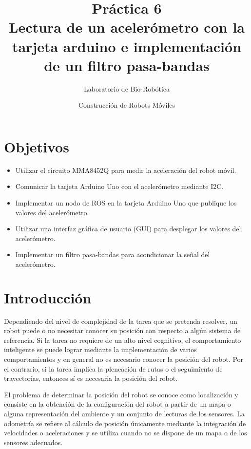 \documentclass[letterpaper,12pt]{article}
\title{Práctica 6 \\ Lectura de un acelerómetro con la tarjeta arduino e implementación de un filtro pasa-bandas}
\author{Laboratorio de Bio-Robótica}
\date{Construcción de Robots Móviles}
\begin{document}
\renewcommand{\tablename}{Tabla}
\maketitle
\section*{Objetivos}
\begin{itemize}
\item Utilizar el circuito MMA8452Q para medir la aceleración del robot móvil. 
\item Comunicar la tarjeta Arduino Uno con el acelerómetro mediante I2C.
\item Implementar un nodo de ROS en la tarjeta Arduino Uno que publique los valores del acelerómetro. 
\item Utilizar una interfaz gráfica de usuario (GUI) para desplegar los valores del acelerómetro. 
\item Implementar un filtro pasa-bandas para acondicionar la señal del acelerómetro.
\end{itemize}

\section{Introducción}
Dependiendo del nivel de complejidad de la tarea que se pretenda resolver, un robot puede o no necesitar conocer su posición con respecto a algún sistema de referencia. Si la tarea no requiere de un alto nivel cognitivo, el comportamiento inteligente se puede lograr mediante la implementación de varios comportamientos y en general no es necesario conocer la posición del robot. Por el contrario, si la tarea implica la pleneación de rutas o el seguimiento de trayectorias, entonces sí es necesaria la posición del robot. 

El problema de determinar la posición del robot se conoce como localización y consiste en la obtención de la configuración del robot a partir de un mapa o alguna representación del ambiente y un conjunto de lecturas de los sensores. La odometría se refiere al cálculo de posición únicamente mediante la integración de velocidades o aceleraciones y se utiliza cuando no se dispone de un mapa o de los sensores adecuados. 
\end{document}
